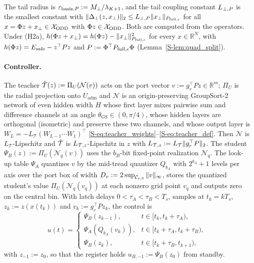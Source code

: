 The tail radius is $\varepsilon_{\mathrm{basis},P} := M_\perp/\lambda_{K+1}$, and the tail coupling constant $L_{\perp,P}$ is the smallest constant with $\|\Delta_\perp(z, x_\perp)\|_2 \le L_{\perp,P}\|x_\perp\|_{P_{\mathrm{full},\epsilon}}$ for all $x = \Phi z + x_\perp \in \mathcal{X}_{\mathrm{ODD}}$ with $\Phi z \in \mathcal{X}_{\mathrm{ODD}}$. Both are computed from the operators. Under (H2a), $h(\Phi z + x_\perp) = h(\Phi z) - \|x_\perp\|_{P_{\mathrm{full},\epsilon}}^2$ for every $x \in \mathbb{R}^N$, with $h(\Phi z) = E_{\mathrm{safe}} - z^\top Pz$ and $P := \Phi^\top P_{\mathrm{full},\epsilon}\Phi$ (Lemma~\ref{S-lem:quad_split}).

\paragraph{Controller.}
The teacher $\hat{\mathcal{T}}(z) := \Pi_U(\mathcal{N}(v))$ acts on the port vector $v := g_r^\top Pz \in \mathbb{R}^m$; $\Pi_U$ is the radial projection onto $U_{\mathrm{adm}}$ and $\mathcal{N}$ is an origin-preserving GroupSort-2 network of even hidden width $H$ whose first layer mixes pairwise sum and difference channels at an angle $\theta_{\mathrm{GS}} \in (0, \pi/4)$, whose hidden layers are orthogonal (isometric) and preserve these two channels, and whose output layer is $W_L = -L_{\mathcal{T}}(W_{L-1}\cdots W_1)^\top$ \eqref{S-eq:teacher_weights}--\eqref{S-eq:teacher_def}. Then $\mathcal{N}$ is $L_{\mathcal{T}}$-Lipschitz and $\hat{\mathcal{T}}$ is $L_{\mathcal{T},z}$-Lipschitz in $z$ with $L_{\mathcal{T},z} := L_{\mathcal{T}}\|g_r^\top P\|_2$. The student $\Psi_B(z) := \Pi_U(\mathcal{N}_q(v))$ uses the $b_B$-bit fixed-point realization $\mathcal{N}_q$. The look-up table $\Psi_A$ quantizes $v$ by the mid-tread quantizer $Q_{b_A}$ with $2^{b_A}+1$ levels per axis over the port box of width $D_v := 2\sup_{\mathcal{C}_{r,0}}\|v\|_\infty$, stores the quantized student's value $\Pi_U(\mathcal{N}_q(v_q))$ at each nonzero grid point $v_q$ and outputs zero on the central bin. With latch delays $0 < \tau_A < \tau_B < T_s$, samples at $t_k = kT_s$, $z_k := z(x(t_k))$ and $v_k := g_r^\top Pz_k$, the control is
\begin{equation}
\label{eq:hold}
u(t) = \begin{cases} \Psi_B(z_{k-1}), & t \in [t_k, t_k + \tau_A),\\ \Psi_A(Q_{b_A}(v_k)), & t \in [t_k + \tau_A, t_k + \tau_B),\\ \Psi_B(z_k), & t \in [t_k + \tau_B, t_{k+1}),\end{cases}
\end{equation}
with $z_{-1} := z_0$, so that the register holds $u_{B,-1} := \Psi_B(z_0)$ from standby.

